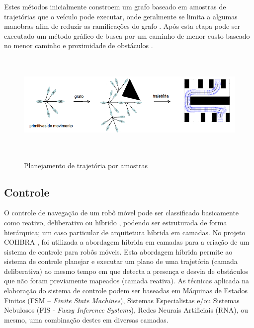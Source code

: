 Estes métodos inicialmente constroem um grafo baseado em amostras de trajetórias
que o veículo pode executar, onde geralmente se limita a algumas manobras afim
de reduzir as ramificações do grafo \cite{topologic}. Após esta etapa pode ser
executado um método gráfico de busca por um caminho de menor custo baseado no
menor caminho e proximidade de obstáculos .

\begin{figure}[ht]
	\centering
	\begin{minipage}[b]{1\linewidth}
	    \centering
	 	\includegraphics[width=\textwidth,height=5cm]{images/sbpl.png}
	 	\caption{Planejamento de trajetória por amostras}
	 	\label{fig:sbpl}
	\end{minipage}
\end{figure}


\subsection{Controle}

O controle de navegação de um robô móvel pode ser classificado basicamente como
reativo, deliberativo ou híbrido \cite{Wolf2009}, podendo ser estruturada de
forma hierárquica; um caso particular de arquitetura híbrida em camadas. No
projeto COHBRA \cite{Heinen2002}, foi utilizada a abordagem híbrida em camadas
para a criação de um sistema de controle para robôs móveis. Esta abordagem
híbrida permite ao sistema de controle planejar e executar um plano de uma
trajetória (camada deliberativa) ao mesmo tempo em que detecta a presença e
desvia de obstáculos que não foram previamente mapeados (camada reativa). As
técnicas aplicada na elaboração do sistema de controle podem ser baseadas em
Máquinas de Estados Finitos (FSM – \textit{Finite State Machines}), Sistemas
Especialistas e/ou Sistemas Nebulosos (FIS - \textit{Fuzzy Inference Systems}),
Redes Neurais Artificiais (RNA), ou mesmo, uma combinação destes em diversas
camadas. 

